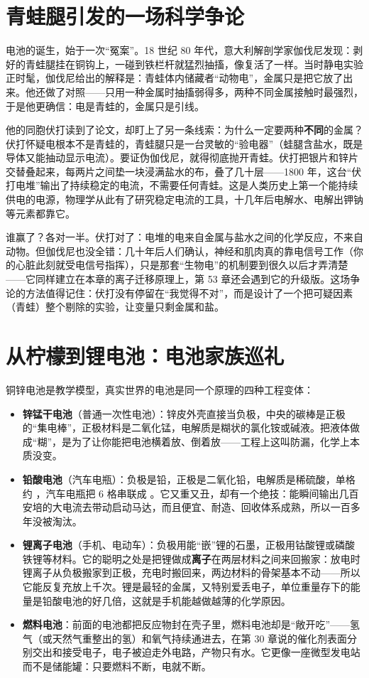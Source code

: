 \section{青蛙腿引发的一场科学争论}

\begin{zhengju}
电池的诞生，始于一次“冤案”。18 世纪 80 年代，意大利解剖学家伽伐尼发现：剥好的青蛙腿挂在铜钩上，一碰到铁栏杆就猛烈抽搐，像复活了一样。当时静电实验正时髦，伽伐尼给出的解释是：青蛙体内储藏者“动物电”，金属只是把它放了出来。他还做了对照——只用一种金属时抽搐弱得多，两种不同金属接触时最强烈，于是他更确信：电是青蛙的，金属只是引线。

他的同胞伏打读到了论文，却盯上了另一条线索：为什么一定要两种\textbf{不同}的金属？伏打怀疑电根本不是青蛙的，青蛙腿只是一台灵敏的“验电器”（蛙腿含盐水，既是导体又能抽动显示电流）。要证伪伽伐尼，就得彻底抛开青蛙。伏打把银片和锌片交替叠起来，每两片之间垫一块浸满盐水的布，叠了几十层——1800 年，这台“伏打电堆”输出了持续稳定的电流，不需要任何青蛙。这是人类历史上第一个能持续供电的电源，物理学从此有了研究稳定电流的工具，十几年后电解水、电解出钾钠等元素都靠它。

谁赢了？各对一半。伏打对了：电堆的电来自金属与盐水之间的化学反应，不来自动物。但伽伐尼也没全错：几十年后人们确认，神经和肌肉真的靠电信号工作（你的心脏此刻就受电信号指挥），只是那套“生物电”的机制要到很久以后才弄清楚——它同样建立在本章的离子迁移原理上，第 53 章还会遇到它的升级版。这场争论的方法值得记住：伏打没有停留在“我觉得不对”，而是设计了一个把可疑因素（青蛙）整个剔除的实验，让变量只剩金属和盐。
\end{zhengju}

\section{从柠檬到锂电池：电池家族巡礼}

铜锌电池是教学模型，真实世界的电池是同一个原理的四种工程变体：

\begin{itemize}[itemsep=2pt]
\item \textbf{锌锰干电池}（普通一次性电池）：锌皮外壳直接当负极，中央的碳棒是正极的“集电棒”，正极材料是二氧化锰，电解质是糊状的氯化铵或碱液。把液体做成“糊”，是为了让你能把电池横着放、倒着放——工程上这叫防漏，化学上本质没变。
\item \textbf{铅酸电池}（汽车电瓶）：负极是铅，正极是二氧化铅，电解质是稀硫酸，单格约 ，汽车电瓶把 6 格串联成 。它又重又丑，却有一个绝技：能瞬间输出几百安培的大电流去带动启动马达，而且便宜、耐造、回收体系成熟，所以一百多年没被淘汰。
\item \textbf{锂离子电池}（手机、电动车）：负极用能“嵌”锂的石墨，正极用钴酸锂或磷酸铁锂等材料。它的聪明之处是把锂做成\textbf{离子}在两层材料之间来回搬家：放电时锂离子从负极搬家到正极，充电时搬回来，两边材料的骨架基本不动——所以它能反复充放上千次。锂是最轻的金属，又特别爱丢电子，单位重量存下的能量是铅酸电池的好几倍，这就是手机能越做越薄的化学原因。
\item \textbf{燃料电池}：前面的电池都把反应物封在壳子里，燃料电池却是“敞开吃”——氢气（或天然气重整出的氢）和氧气持续通进去，在第 30 章说的催化剂表面分别交出和接受电子，电子被迫走外电路，产物只有水。它更像一座微型发电站而不是储能罐：只要燃料不断，电就不断。
\end{itemize}

